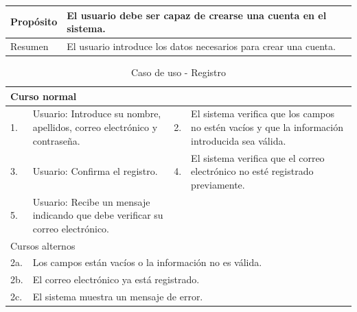 \begin{table}[H]
	\centering
	\begin{tabular}{| m{} | m{} | m{} | m{} |}
		\hline
		Propósito & \multicolumn{3}{m{0.67\textwidth}|}{El usuario debe ser capaz de crearse una cuenta en el sistema.}   \\ 
		\hline
		Resumen & \multicolumn{3}{m{0.67\textwidth}|}{El usuario introduce los datos necesarios para crear una cuenta.} \\ 
		\hline
	\end{tabular}
\end{table}

\begin{table}[H]
	\centering
	\begin{tabular}{| m{} | m{} | m{} | m{} |}
		\hline
		\multicolumn{4}{|m{0.9\textwidth}|}{Curso normal}     \\ 
		\hline
		1. & Usuario: Introduce su nombre, apellidos, correo electrónico y contraseña. 
        & 2. & El sistema verifica que los campos no estén vacíos y que la información introducida sea válida. \\ 
		\hline
		3. & Usuario: Confirma el registro. & 4. & El sistema verifica que el correo electrónico no esté registrado previamente.   \\ 
		\hline
        5. & Usuario: Recibe un mensaje indicando que debe verificar su correo electrónico. &  &  \\ 
        \hline
		\multicolumn{4}{|m{0.9\textwidth}|}{Cursos alternos}     \\
        \hline 
        2a. & \multicolumn{3}{l|}{Los campos están vacíos o la información no es válida.} \\ 
        \hline
        2b. & \multicolumn{3}{l|}{El correo electrónico ya está registrado.} \\ 
        \hline
        2c. & \multicolumn{3}{l|}{El sistema muestra un mensaje de error.} \\ 
        \hline
	\end{tabular}
	\caption{Caso de uso - Registro}
\end{table}

